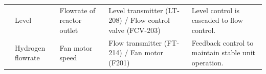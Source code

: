 \begin{table}[h]
{\begin{tabular}{@{}p{3cm}|p{3cm}|p{4cm}|p{5cm}|p{6cm}@{}}
                                            & Level                                       & Flowrate of reactor outlet                              & Level transmitter (LT-208) / Flow control valve (FCV-203)                  & Level control is cascaded to flow control.                                                                                           \\
                                                                                        & Hydrogen flowrate                                     & Fan motor speed                              & Flow transmitter (FT-214) / Fan motor (F201)                  & Feedback control to maintain stable unit operation.                                                                                           \\
                                                                   

\end{tabular}}
\end{table}
